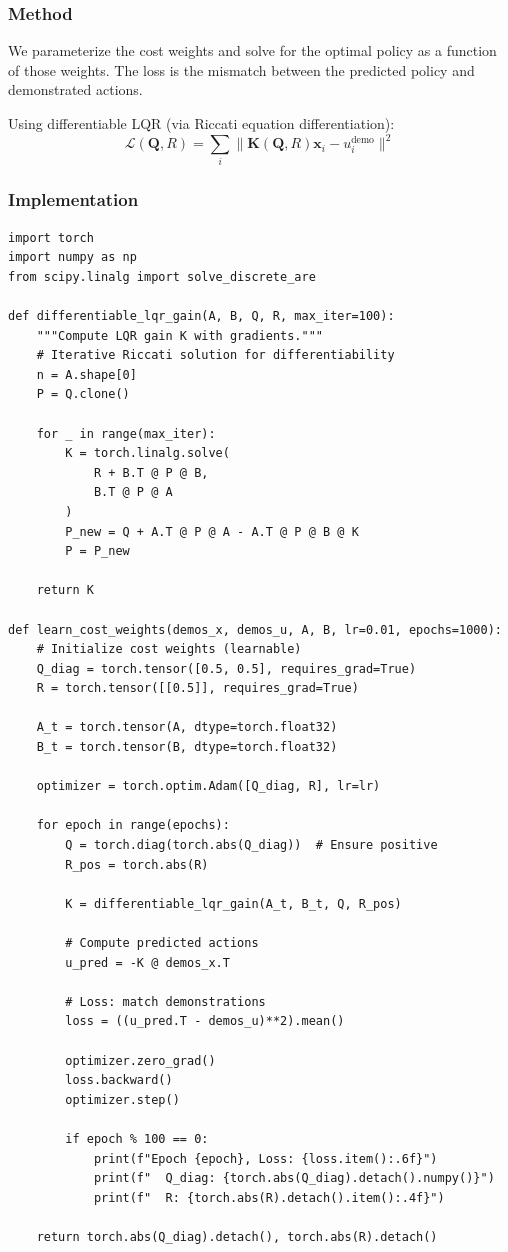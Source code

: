 \subsubsection{Method}

We parameterize the cost weights and solve for the optimal policy as a function of those weights. The loss is the mismatch between the predicted policy and demonstrated actions.

Using differentiable LQR (via Riccati equation differentiation):
\begin{equation}
\mathcal{L}(\mathbf{Q}, R) = \sum_{i} \| \mathbf{K}(\mathbf{Q}, R) \mathbf{x}_i - u_i^{\text{demo}} \|^2
\end{equation}

\subsubsection{Implementation}

\begin{verbatim}
import torch
import numpy as np
from scipy.linalg import solve_discrete_are

def differentiable_lqr_gain(A, B, Q, R, max_iter=100):
    """Compute LQR gain K with gradients."""
    # Iterative Riccati solution for differentiability
    n = A.shape[0]
    P = Q.clone()

    for _ in range(max_iter):
        K = torch.linalg.solve(
            R + B.T @ P @ B,
            B.T @ P @ A
        )
        P_new = Q + A.T @ P @ A - A.T @ P @ B @ K
        P = P_new

    return K

def learn_cost_weights(demos_x, demos_u, A, B, lr=0.01, epochs=1000):
    # Initialize cost weights (learnable)
    Q_diag = torch.tensor([0.5, 0.5], requires_grad=True)
    R = torch.tensor([[0.5]], requires_grad=True)

    A_t = torch.tensor(A, dtype=torch.float32)
    B_t = torch.tensor(B, dtype=torch.float32)

    optimizer = torch.optim.Adam([Q_diag, R], lr=lr)

    for epoch in range(epochs):
        Q = torch.diag(torch.abs(Q_diag))  # Ensure positive
        R_pos = torch.abs(R)

        K = differentiable_lqr_gain(A_t, B_t, Q, R_pos)

        # Compute predicted actions
        u_pred = -K @ demos_x.T

        # Loss: match demonstrations
        loss = ((u_pred.T - demos_u)**2).mean()

        optimizer.zero_grad()
        loss.backward()
        optimizer.step()

        if epoch % 100 == 0:
            print(f"Epoch {epoch}, Loss: {loss.item():.6f}")
            print(f"  Q_diag: {torch.abs(Q_diag).detach().numpy()}")
            print(f"  R: {torch.abs(R).detach().item():.4f}")

    return torch.abs(Q_diag).detach(), torch.abs(R).detach()
\end{verbatim}

